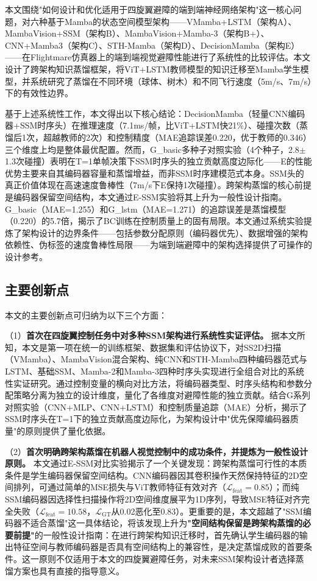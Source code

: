 \documentclass[12pt,a4paper]{article}
\numberwithin{equation}{section}
\numberwithin{figure}{section}
\numberwithin{table}{section}
\begin{document}
本文围绕"如何设计和优化适用于四旋翼避障的端到端神经网络架构"这一核心问题，对六种基于Mamba的状态空间模型架构——VMamba+LSTM（架构A）、MambaVision+SSM（架构B）、MambaVision+Mamba-3（架构B+）、CNN+Mamba3（架构C）、STH-Mamba（架构D）、DecisionMamba（架构E）——在Flightmare仿真器\cite{shah2017flightmare}上的端到端视觉避障性能进行了系统性的比较评估。本文设计了跨架构知识蒸馏框架，将ViT+LSTM教师模型\cite{bhattacharya2024vitfly}的知识迁移至Mamba学生模型，并系统研究了蒸馏在不同环境（球体、树木）和不同飞行速度（5m/s、7m/s）下的有效性边界。

基于上述系统性工作，本文得出以下核心结论：DecisionMamba（轻量CNN编码器+SSM时序头）在推理速度（7.1ms/帧，比ViT+LSTM快21\%）、碰撞次数（蒸馏后1次，超越教师的2次）和控制精度（MAE追踪误差0.220，优于教师的0.346）三个维度上均是整体最优配置。然而，G\_basic多种子对照实验（4个种子，2.8$\pm$1.3次碰撞）表明在T=1单帧决策下SSM时序头的独立贡献高度边际化——E的性能优势主要来自其编码器容量和蒸馏增益，而非SSM时序建模范式本身。SSM头的真正价值体现在高速速度鲁棒性（7m/s下E保持1次碰撞）。跨架构蒸馏的核心前提是编码器保留空间结构，本文通过E-SSM实验将其上升为一般性设计指南。G\_basic（MAE=1.255）和G\_lstm（MAE=1.271）的追踪误差是蒸馏模型（0.220）的5.7倍，揭示了BC训练在控制质量上的固有局限。本文通过系统实验提炼了架构设计的边界条件——包括参数分配原则（编码器优先）、数据增强的架构依赖性、伪标签的速度鲁棒性局限——为端到端避障中的架构选择提供了可操作的设计参考。

\subsection{主要创新点}

本文的主要创新点可归纳为以下三个方面：

（1）\textbf{首次在四旋翼控制任务中对多种SSM架构进行系统性实证评估。} 据本文所知，本文是第一项在统一的训练框架、数据集和评估协议下，对SS2D扫描（VMamba）、MambaVision混合架构、纯CNN和STH-Mamba四种编码器范式与LSTM、基础SSM、Mamba-2和Mamba-3四种时序头实现进行全组合对比的系统性实证研究。通过控制变量的横向对比方法，将编码器类型、时序头结构和参数分配策略分离为独立的设计维度，量化了各维度对避障性能的独立贡献。结合G系列对照实验（CNN+MLP、CNN+LSTM）和控制质量追踪（MAE）分析，揭示了SSM时序头在T=1下的独立贡献高度边际化，为架构设计中"优先保障编码器质量"的原则提供了量化依据。

（2）\textbf{首次明确跨架构蒸馏在机器人视觉控制中的成功条件，并提炼为一般性设计原则。} 本文通过E-SSM对比实验揭示了一个关键发现：跨架构蒸馏可行性的本质条件是学生编码器保留空间结构。CNN编码器因其卷积操作天然保持特征的2D空间排列，可通过简单的MSE损失与ViT教师特征有效对齐（$\mathcal{L}_{\text{feat}}=0.85$）；而纯SSM编码器因选择性扫描操作将2D空间维度展平为1D序列，导致MSE特征对齐完全失败（$\mathcal{L}_{\text{feat}}=10.58$，$\mathcal{L}_{\text{GT}}$从0.02恶化至0.83）。更重要的是，本文超越了"SSM编码器不适合蒸馏"这一具体结论，将该发现上升为\textbf{"空间结构保留是跨架构蒸馏的必要前提"}的一般性设计指南：在进行跨架构知识迁移时，首先确认学生编码器的输出特征空间与教师编码器是否具有空间结构上的兼容性，是决定蒸馏成败的首要条件。这一原则不仅适用于本文的四旋翼避障任务，对未来SSM架构设计者选择蒸馏方案也具有直接的指导意义。
\end{document}

